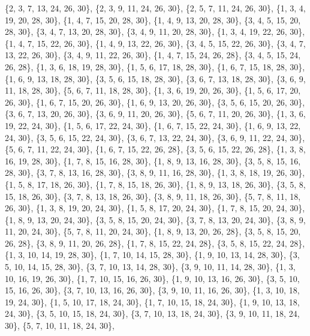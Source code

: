 \documentclass[11pt,a4paper]{article}
\begin{document}
{\{2, 3, 7, 13, 24, 26, 30\}, \{2, 3, 9, 11, 24, 26, 30\}, \{2, 5, 7, 11, 24, 26, 30\}, \{1, 3, 4, 19, 20, 28, 30\}, \{1, 4, 7, 15, 20, 28, 30\},
\{1, 4, 9, 13, 20, 28, 30\}, \{3, 4, 5, 15, 20, 28, 30\}, \{3, 4, 7, 13, 20, 28, 30\}, \{3, 4, 9, 11, 20, 28, 30\}, \{1, 3, 4, 19, 22, 26, 30\},
\{1, 4, 7, 15, 22, 26, 30\}, \{1, 4, 9, 13, 22, 26, 30\}, \{3, 4, 5, 15, 22, 26, 30\}, \{3, 4, 7, 13, 22, 26, 30\}, \{3, 4, 9, 11, 22, 26, 30\},
\{1, 4, 7, 15, 24, 26, 28\}, \{3, 4, 5, 15, 24, 26, 28\}, \{1, 3, 6, 18, 19, 28, 30\}, \{1, 5, 6, 17, 18, 28, 30\}, \{1, 6, 7, 15, 18, 28, 30\},
\{1, 6, 9, 13, 18, 28, 30\}, \{3, 5, 6, 15, 18, 28, 30\}, \{3, 6, 7, 13, 18, 28, 30\}, \{3, 6, 9, 11, 18, 28, 30\}, \{5, 6, 7, 11, 18, 28, 30\},
\{1, 3, 6, 19, 20, 26, 30\}, \{1, 5, 6, 17, 20, 26, 30\}, \{1, 6, 7, 15, 20, 26, 30\}, \{1, 6, 9, 13, 20, 26, 30\}, \{3, 5, 6, 15, 20, 26, 30\},
\{3, 6, 7, 13, 20, 26, 30\}, \{3, 6, 9, 11, 20, 26, 30\}, \{5, 6, 7, 11, 20, 26, 30\}, \{1, 3, 6, 19, 22, 24, 30\}, \{1, 5, 6, 17, 22, 24, 30\},
\{1, 6, 7, 15, 22, 24, 30\}, \{1, 6, 9, 13, 22, 24, 30\}, \{3, 5, 6, 15, 22, 24, 30\}, \{3, 6, 7, 13, 22, 24, 30\}, \{3, 6, 9, 11, 22, 24, 30\},
\{5, 6, 7, 11, 22, 24, 30\}, \{1, 6, 7, 15, 22, 26, 28\}, \{3, 5, 6, 15, 22, 26, 28\}, \{1, 3, 8, 16, 19, 28, 30\}, \{1, 7, 8, 15, 16, 28, 30\},
\{1, 8, 9, 13, 16, 28, 30\}, \{3, 5, 8, 15, 16, 28, 30\}, \{3, 7, 8, 13, 16, 28, 30\}, \{3, 8, 9, 11, 16, 28, 30\}, \{1, 3, 8, 18, 19, 26, 30\},
\{1, 5, 8, 17, 18, 26, 30\}, \{1, 7, 8, 15, 18, 26, 30\}, \{1, 8, 9, 13, 18, 26, 30\}, \{3, 5, 8, 15, 18, 26, 30\}, \{3, 7, 8, 13, 18, 26, 30\},
\{3, 8, 9, 11, 18, 26, 30\}, \{5, 7, 8, 11, 18, 26, 30\}, \{1, 3, 8, 19, 20, 24, 30\}, \{1, 5, 8, 17, 20, 24, 30\}, \{1, 7, 8, 15, 20, 24, 30\},
\{1, 8, 9, 13, 20, 24, 30\}, \{3, 5, 8, 15, 20, 24, 30\}, \{3, 7, 8, 13, 20, 24, 30\}, \{3, 8, 9, 11, 20, 24, 30\}, \{5, 7, 8, 11, 20, 24, 30\},
\{1, 8, 9, 13, 20, 26, 28\}, \{3, 5, 8, 15, 20, 26, 28\}, \{3, 8, 9, 11, 20, 26, 28\}, \{1, 7, 8, 15, 22, 24, 28\}, \{3, 5, 8, 15, 22, 24, 28\},
\{1, 3, 10, 14, 19, 28, 30\}, \{1, 7, 10, 14, 15, 28, 30\}, \{1, 9, 10, 13, 14, 28, 30\}, \{3, 5, 10, 14, 15, 28, 30\}, \{3, 7, 10, 13, 14, 28, 30\},
\{3, 9, 10, 11, 14, 28, 30\}, \{1, 3, 10, 16, 19, 26, 30\}, \{1, 7, 10, 15, 16, 26, 30\}, \{1, 9, 10, 13, 16, 26, 30\}, \{3, 5, 10, 15, 16, 26, 30\},
\{3, 7, 10, 13, 16, 26, 30\}, \{3, 9, 10, 11, 16, 26, 30\}, \{1, 3, 10, 18, 19, 24, 30\}, \{1, 5, 10, 17, 18, 24, 30\}, \{1, 7, 10, 15, 18, 24, 30\},
\{1, 9, 10, 13, 18, 24, 30\}, \{3, 5, 10, 15, 18, 24, 30\}, \{3, 7, 10, 13, 18, 24, 30\}, \{3, 9, 10, 11, 18, 24, 30\}, \{5, 7, 10, 11, 18, 24, 30\},
}
\end{document}
